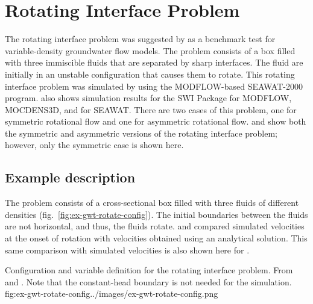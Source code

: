 \section{Rotating Interface Problem}

The rotating interface problem was suggested by \cite{bakker2004} as a  benchmark test for variable-density groundwater flow models. The problem consists of a box filled with three immiscible fluids that are separated by sharp interfaces.  The fluid are initially in an unstable configuration that causes them to rotate.  This rotating interface problem was simulated by \cite{langevin2003seawat} using the MODFLOW-based SEAWAT-2000 program.  \cite{bakker2004} also shows simulation results for the SWI Package for MODFLOW, MOCDENS3D, and for SEAWAT.  There are two cases of this problem, one for symmetric rotational flow and one for asymmetric rotational flow.   \cite{bakker2004}  and  \cite{langevin2003seawat} show both the symmetric and asymmetric versions of the rotating interface problem; however, only the symmetric case is shown here.

\subsection{Example description}

 The problem consists of a cross-sectional box filled with three fluids of different densities (fig.~\ref{fig:ex-gwt-rotate-config}). The initial boundaries between the fluids are not horizontal, and thus, the fluids rotate. \cite{bakker2004} and \cite{langevin2003seawat} compared simulated velocities at the onset of rotation with velocities obtained using an analytical solution.  This same comparison with simulated velocities is also shown here for \mf.  
 
\begin{StandardFigure}{
                                     Configuration and variable definition for the rotating interface problem.  From \cite{bakker2004} and \cite{langevin2003seawat}.  Note that the constant-head boundary is not needed for the \mf simulation.
                                     }{fig:ex-gwt-rotate-config}{../images/ex-gwt-rotate-config.png}
\end{StandardFigure}            

